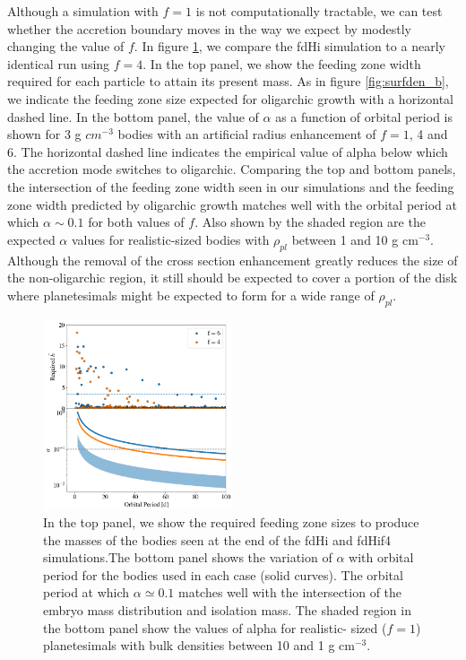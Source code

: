 \documentclass[twocolumn]{aastex63}
\begin{document}
Although a simulation with $f=1$ is not computationally tractable, we
can test whether the accretion boundary moves in the way we expect by
modestly changing the value of $f$. In figure \ref{fig:f6f4_b}, we
compare the fdHi simulation to a nearly identical run using $f=4$. In
the top panel, we show the feeding zone width required for each particle to
attain its present mass. As in figure \ref{fig:surfden_b}, we indicate the feeding
zone size expected for oligarchic growth with a horizontal dashed line. In the bottom panel, the value
of $\alpha$ as a function of orbital period is shown for 3 g $cm^{-3}$
bodies with an artificial radius enhancement of $f=1$, 4 and 6. The
horizontal dashed line indicates the empirical value of alpha below which the
accretion mode switches to oligarchic. Comparing the top and
bottom panels, the intersection of the feeding zone width seen in our simulations and the
feeding zone width predicted by oligarchic growth matches well with the orbital period at which $\alpha
\sim 0.1$ for both values of $f$.  Also shown by the shaded region are the expected $\alpha$ values for
realistic-sized bodies with $\rho_{pl}$ between 1 and 10 g cm$^{-3}$. Although the removal of the cross section
enhancement greatly reduces the size of the non-oligarchic region, it still should be expected to cover a portion of the
disk where planetesimals might be expected to form for a wide range of $\rho_{pl}$.

\begin{figure}
\begin{center}
    \includegraphics[width=0.5\textwidth]{figures/f6f4_b.png}
    \caption{In the top panel, we show the required feeding zone sizes to produce the masses of the bodies seen
    at the end of the fdHi and fdHif4 simulations.The bottom panel shows the variation of $\alpha$ with orbital period for the 
    bodies used in each case (solid curves). The orbital period at which $\alpha \simeq 0.1$ matches well with the intersection of 
    the embryo mass distribution and isolation mass. The shaded region in the bottom panel show the values of alpha for realistic-
    sized ($f=1$) planetesimals with bulk densities between 10 and 1 g cm$^{-3}$.\label{fig:f6f4_b}}
\end{center}
\end{figure}
\end{document}
